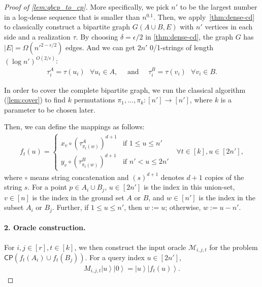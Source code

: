 \documentclass[10pt,a4paper]{article}
\newcommand{\ket}[1]{\left| #1 \right\rangle}
\begin{document}
\begin{proof}[Proof of \cref{lem:qbcp_to_cp}]
More specifically, we pick $n'$ to be the largest number in a log-dense sequence that is smaller than $n^{0.1}$. Then, we apply~\cref{thm:dense-cd} to classically construct a bipartite graph $G(A\cup B,E)$ with $n'$ vertices in each side and a realization $\tau$.
By choosing $\delta = \epsilon/2$ in \cref{thm:dense-cd}, the graph $G$ has $|E|=\Omega(n'^{2-\epsilon/2})$ edges. And we can get $2n'$ 0/1-strings of length $(\log n')^{O(2/\epsilon)}$:
\begin{align}
    \tau^A_i=\tau(u_i)~~~\forall u_i\in A, \quad\text{ and }\quad
    \tau^B_i=\tau(v_i)~~~\forall v_i\in B.
\end{align}

In order to cover the complete bipartite graph, we run the classical algorithm (\cref{lem:cover}) to find $k$ permutations $\pi_1,\dots, \pi_k:[n']\rightarrow [n']$, where $k$ is a parameter to be chosen later.

Then, we can define the mappings as follows:  
\begin{align}\label{eq:fcn_cp}
    f_t(u)=
    \begin{cases}
        x_v\circ \left(\tau^A_{\pi_t(w)}\right)^{d+1} & \text{if }1\leq u\leq n'\\
        y_v\circ \left(\tau^B_{\pi_t(w)}\right)^{d+1} & \text{if }n'<u\leq 2n'
    \end{cases} ~~~\forall t\in [k], u\in [2n'],
\end{align}
where $\circ$ means string concatenation and $(s)^{d+1}$ denotes $d+1$ copies of the string $s$. For a point $p\in A_i\cup B_j$, $u\in [2n']$ is the index in this union-set,  $v\in [n]$ is the index in the ground set $A$ or $B$, and $w\in [n']$ is the index in the subset $A_i$ or $B_j$. Further, if $1\leq u\leq n'$, then $w:=u$; otherwise, $w:=u-n'$.

\paragraph{2. Oracle construction.}
For $i,j\in [r],t\in [k]$, we then construct the input oracle $\mathcal{M}_{i,j,t}$ for the problem $\textsf{CP}(f_t(A_i)\cup f_t(B_j))$. For a query index $u\in [2n']$, 
\begin{align}\label{eq:oracle_cp}
    M_{i,j,t}\ket{u}\ket{0}=\ket{u}\ket{f_t(u)}.
\end{align}


\end{proof}
\end{document}
